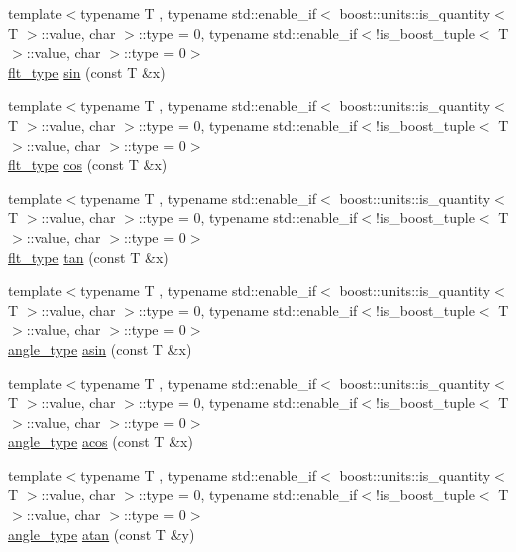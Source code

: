 \begin{DoxyCompactItemize}
\item 
{\footnotesize template$<$typename T , typename std\-::enable\-\_\-if$<$ boost\-::units\-::is\-\_\-quantity$<$ T $>$\-::value, char $>$\-::type  = 0, typename std\-::enable\-\_\-if$<$!is\-\_\-boost\-\_\-tuple$<$ T $>$\-::value, char $>$\-::type  = 0$>$ }\\\hyperlink{lib_2IceBRG__main_2common_8h_ad0f130a56eeb944d9ef2692ee881ecc4}{flt\-\_\-type} \hyperlink{namespaceIceBRG_a04ad41f0eaebbdc9dd5cc3ebfa442aef}{sin} (const T \&x)
\item 
{\footnotesize template$<$typename T , typename std\-::enable\-\_\-if$<$ boost\-::units\-::is\-\_\-quantity$<$ T $>$\-::value, char $>$\-::type  = 0, typename std\-::enable\-\_\-if$<$!is\-\_\-boost\-\_\-tuple$<$ T $>$\-::value, char $>$\-::type  = 0$>$ }\\\hyperlink{lib_2IceBRG__main_2common_8h_ad0f130a56eeb944d9ef2692ee881ecc4}{flt\-\_\-type} \hyperlink{namespaceIceBRG_a7b18a17729d2c769d6a997fdca424e0d}{cos} (const T \&x)
\item 
{\footnotesize template$<$typename T , typename std\-::enable\-\_\-if$<$ boost\-::units\-::is\-\_\-quantity$<$ T $>$\-::value, char $>$\-::type  = 0, typename std\-::enable\-\_\-if$<$!is\-\_\-boost\-\_\-tuple$<$ T $>$\-::value, char $>$\-::type  = 0$>$ }\\\hyperlink{lib_2IceBRG__main_2common_8h_ad0f130a56eeb944d9ef2692ee881ecc4}{flt\-\_\-type} \hyperlink{namespaceIceBRG_a20953f0d45c0e18a4afca58bdcd494d8}{tan} (const T \&x)
\item 
{\footnotesize template$<$typename T , typename std\-::enable\-\_\-if$<$ boost\-::units\-::is\-\_\-quantity$<$ T $>$\-::value, char $>$\-::type  = 0, typename std\-::enable\-\_\-if$<$!is\-\_\-boost\-\_\-tuple$<$ T $>$\-::value, char $>$\-::type  = 0$>$ }\\\hyperlink{namespaceIceBRG_a688eeb0811a2474b20b667ed2e9625a1}{angle\-\_\-type} \hyperlink{namespaceIceBRG_aad70c8f9e18dfb0f3e6634e8839fc2a2}{asin} (const T \&x)
\item 
{\footnotesize template$<$typename T , typename std\-::enable\-\_\-if$<$ boost\-::units\-::is\-\_\-quantity$<$ T $>$\-::value, char $>$\-::type  = 0, typename std\-::enable\-\_\-if$<$!is\-\_\-boost\-\_\-tuple$<$ T $>$\-::value, char $>$\-::type  = 0$>$ }\\\hyperlink{namespaceIceBRG_a688eeb0811a2474b20b667ed2e9625a1}{angle\-\_\-type} \hyperlink{namespaceIceBRG_aafffed9107a979b514798b6493c15919}{acos} (const T \&x)
\item 
{\footnotesize template$<$typename T , typename std\-::enable\-\_\-if$<$ boost\-::units\-::is\-\_\-quantity$<$ T $>$\-::value, char $>$\-::type  = 0, typename std\-::enable\-\_\-if$<$!is\-\_\-boost\-\_\-tuple$<$ T $>$\-::value, char $>$\-::type  = 0$>$ }\\\hyperlink{namespaceIceBRG_a688eeb0811a2474b20b667ed2e9625a1}{angle\-\_\-type} \hyperlink{namespaceIceBRG_af151d6be2f37ea1565bed01089b72e07}{atan} (const T \&y)

\end{DoxyCompactItemize}
